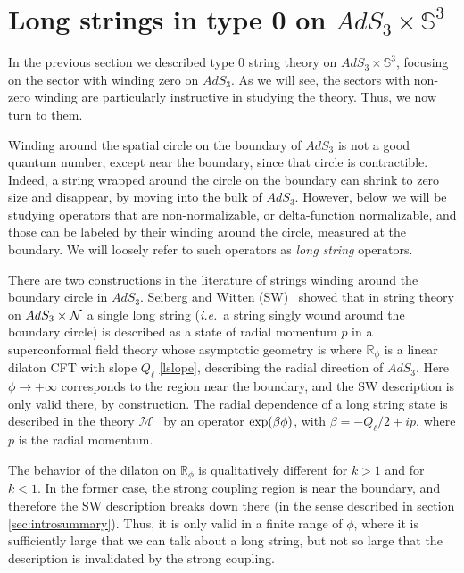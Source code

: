 \documentclass[12pt]{article}
\def\ie{{i.e.}}
\def\MM{{\mathcal{M}}}
\def\NN{{\mathcal{N}}}
\newcommand{\bR}{{\mathbb R}}
\newcommand{\bS}{{\mathbb S}}
\numberwithin{equation}{section}
\def\cM{\mathcal {M}} \def\cN{\mathcal {N}} \def\cO{\mathcal {O}}
\def\ie{{\it i.e.}}
\def\MM{{\cal M}}
\def\NN{{\cal N}}
\def\exp{{\rm exp}}
\def\ie{{\it i.e.}}
\begin{document}

\section{Long strings in type 0 on \texorpdfstring{$AdS_3\times \bS^3$}{} }
\label{sec:type0long}

In the previous section we described type 0 string theory on $AdS_3\times \bS^3$, focusing on the sector with winding zero on $AdS_3$. As we will see, the sectors with non-zero winding are particularly instructive in studying the theory. Thus, we now turn to them.  

Winding around the spatial circle on the boundary of $AdS_3$ is not a good quantum number, except near the boundary, since that circle is contractible. Indeed, a string wrapped around the circle on the boundary can shrink to zero size and disappear, by moving into the bulk of $AdS_3$. However, below we will be studying operators that are non-normalizable, or delta-function normalizable, and those can be labeled by their winding around the circle, measured at the boundary. We will loosely refer to such operators as {\it long string} operators.

There are two constructions in the literature of strings winding around the boundary circle in $AdS_3$. Seiberg and Witten (SW)~ showed that in string theory on $AdS_3\times \NN$ a single long string (\ie\ a string singly wound around the boundary circle) is described as a state of radial momentum $p$ in a superconformal field theory whose asymptotic geometry is
\eqn[mmll]{\MM=\bR_\phi\times\NN ~,}
where $\bR_\phi$ is a linear dilaton CFT with slope $Q_\ell$ \eqref{lslope},
describing the radial direction of $AdS_3$.  Here $\phi\to+\infty$ corresponds to the region near the boundary, and the SW description is only valid there, by construction.  The radial dependence of a long string state is described in the theory $\cM$ \mmll\ by an operator $\exp(\beta\phi)$, with $\beta=-Q_\ell/2+ip$, where $p$ is the radial momentum.


The behavior of the dilaton on $\bR_\phi$ is qualitatively different for $k>1$ and for $k<1$. In the former case, the strong coupling region is near the boundary, and therefore the SW description breaks down there (in the sense described in section \ref{sec:introsummary}). Thus, it is only valid in a finite range of $\phi$, where it is sufficiently large that we can talk about a long string, but not so large that the description is invalidated by the strong coupling.
\end{document}
